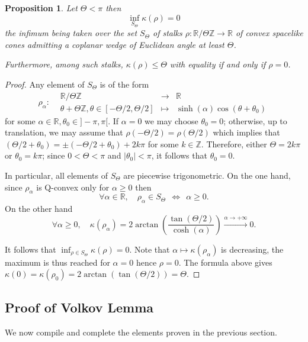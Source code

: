 \documentclass[a4paper,12pt]{article}
\def\ZZ{\mathbb{Z}}
\def\RR{\mathbb{R}}
\newcommand{\function}[5]{\displaystyle#1:\begin{array}{l|rcl}
& \displaystyle #2 & \longrightarrow & \displaystyle #3 \\
	& \displaystyle #4 & \longmapsto & \displaystyle #5 \end{array}}
\newtheorem{prop}[lem]{Proposition}
\theoremstyle{definition}
\begin{document}
					\begin{prop}\label{prop:volkov_inf_pi} Let $\Theta < \pi$ then 
					 $$\inf_{S_\Theta}\kappa(\rho) = 0$$ the infimum being taken over the set $S_\Theta$ of  stalks $\rho:\RR/\Theta\ZZ\rightarrow \RR$ of convex spacelike cones admitting a coplanar wedge of Euclidean angle at least $\Theta$.
					 
					 Furthermore, among such stalks, $\kappa(\rho)\leq \Theta$ with equality if and only if $\rho= 0$.
					\end{prop}
					\begin{proof}
					 
					 Any element of $S_\Theta$ is of the form $$ \function{\rho_\alpha}{\RR/\Theta\ZZ}{\RR}{\theta+\Theta\ZZ,\theta \in [-\Theta/2,\Theta/2]}{\sinh(\alpha) \cos(\theta+\theta_0)} $$
					 for some $\alpha\in \RR,\theta_0\in ]-\pi,\pi[$.
					 If $\alpha=0$ we may choose $\theta_0=0$; otherwise,
					 up to translation, we may assume that $\rho(-\Theta/2)=\rho(\Theta/2)$ which implies that $(\Theta/2+\theta_0) = \pm(-\Theta/2+\theta_0)+2k\pi$ for some $k\in \ZZ$. Therefore, either $\Theta=2k\pi$ or $\theta_0=k\pi$; since $0<\Theta<\pi$ and $|\theta_0|<\pi$, it follows that $\theta_0=0$.
					 
					 In particular, all elements of $S_\Theta$ are piecewise trigonometric. On the one hand, since $\rho_\alpha$ is Q-convex only for $\alpha\geq 0$ then $$\forall \alpha\in\RR,\quad \rho_\alpha \in S_\Theta ~~\Leftrightarrow ~~ \alpha\geq 0.$$ On the other hand $$\forall \alpha\geq 0,\quad \kappa(\rho_\alpha) = 2\arctan\left(\frac{\tan(\Theta/2)}{\cosh(\alpha)}\right)\xrightarrow{\alpha\rightarrow +\infty} 0.$$
					
					It follows that $\inf_{\rho \in S_\Theta} \kappa(\rho)=0$. Note that $\alpha\mapsto \kappa(\rho_\alpha)$ is decreasing, the maximum is thus reached for $\alpha=0$ hence $\rho=0$. The formula above gives $\kappa(0)=\kappa(\rho_0) = 2\arctan(\tan(\Theta/2))=\Theta$.
					\end{proof}
					
            \subsection{Proof of Volkov Lemma}
            We now compile and complete the elements proven in the previous section.
            
\end{document}
